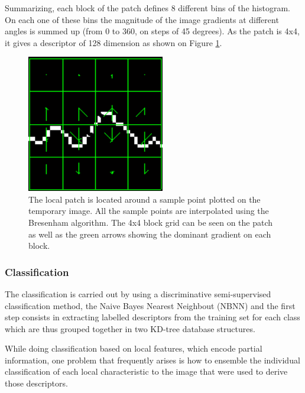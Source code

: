 \documentclass[entropy,article,submit,moreauthors,pdftex,10pt,a4paper]{mdpi}
\begin{document}
Summarizing, each block of the patch defines 8 different bins of the histogram.  On each one of these bins  the magnitude of the image gradients at different angles is summed up (from 0 to 360, on steps of 45 degrees).  As the patch is 4x4, it gives a descriptor of 128 dimension as shown on Figure \ref{fig:sampledescriptor}.
 
\begin{figure}[H]
\centering
\includegraphics[width=6cm]{sampledescriptor.png}
\caption{The local patch is located around a sample point plotted on the temporary image. All the sample points are interpolated using the Bresenham algorithm. The 4x4 block grid can be seen on the patch as well as the green arrows showing the dominant gradient on each block.}
\label{fig:sampledescriptor}
\end{figure}


\subsubsection{Classification}

The classification is carried out by using a discriminative semi-supervised classification method, the Naive Bayes Nearest Neighbout (NBNN) \citep{Boiman2008} and the first step consists in extracting labelled descriptors from the training set for each class which are thus grouped together in two KD-tree \citep{Vedaldi2010} database structures.


While doing classification based on local features, which encode partial information, one problem that frequently arises is how to ensemble the individual classification of each local characteristic to the image that were used to derive those descriptors.
\end{document}
